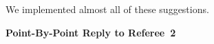 \documentclass[11pt]{article}
\begin{document}
We implemented almost all of these suggestions.

  
  
  
  
  
  
  
  


\clearpage
\begin{center}
  {\bf \Large Point-By-Point Reply to Referee~2}
\end{center}
\end{document}
